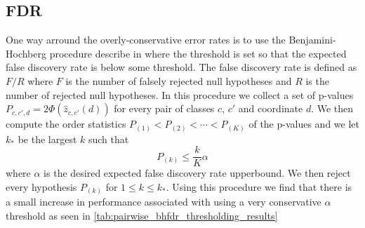 \documentclass{article}
\begin{document}
\subsection{FDR}

One way arround the overly-conservative error rates is to use
the Benjamini-Hochberg procedure describe in 
\cite{bhoch95} where the threshold is set so that the 
expected false discovery rate is below some threshold. The
false discovery rate is defined as $F/R$ where
$F$ is the number of falsely rejected null hypotheses and
$R$ is the number of rejected null hypotheses.  In this procedure
we collect a set of p-values $P_{c,c',d}=2\Phi(\hat{z}_{c,c'}(d))$
for every pair of classes $c$, $c'$ and coordinate $d$.  We then
compute the order statistics $P_{(1)} <P_{(2)} <\cdots <P_{(K)}$
of the p-values and we let $k_*$ be the largest $k$ such that
\begin{equation}
P_{(k)} \leq \frac{k}{K} \alpha
\end{equation}
where $\alpha$ is the desired expected false discovery rate upperbound.  We then reject every hypothesis $P_{(k)}$ for $1\leq k\leq k_*$.
Using this procedure we find that there is a small increase
in performance associated with using a very conservative $\alpha$
threshold as seen in \autoref{tab:pairwise_bhfdr_thresholding_results}
\end{document}
